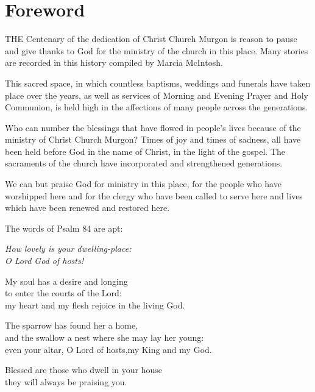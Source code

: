 \documentclass[a4paper,11pt,parskip=never,DIV=8,chapterprefix=true,titlepage=true,twoside,twocolumn,open=any]{scrbook}
\begin{document}

\chapter{Foreword}


\lettrine[lines=3]{T}{HE} Centenary of the dedication of Christ Church Murgon is reason to pause and 
give thanks to God for the ministry of the church in this place. Many stories 
are recorded in this history compiled by Marcia McIntosh.
\smallskip

\noindent
This sacred space, in which countless baptisms, weddings and funerals have taken 
place over the years, as well as services of Morning and Evening Prayer and Holy 
Communion, is held high in the affections of many people across the generations.  
\smallskip

\noindent
Who can number the blessings that have flowed in people's lives because of the 
ministry of Christ Church Murgon? Times of joy and times of sadness, all have been 
held before God in the name of Christ, in the light of the gospel. The sacraments 
of the church have incorporated and strengthened generations. 
\smallskip

\noindent
We can but praise God for ministry in this place, for the people who have worshipped 
here and for the clergy who have been called to serve here and lives which have 
been renewed and restored here.

\smallskip

\noindent The words of Psalm 84 are apt:
\smallskip

\begin{center}
\begin{minipage}[b]{.6\linewidth}%
{\itshape
{} How lovely is your dwelling-place:\\
\hphantom{MM}O Lord God of hosts!

 My soul has a desire and longing\\
\hphantom{MM}to enter the courts of the Lord:\\
\hphantom{MM}my heart and my flesh rejoice in the living God.

 The sparrow has found her a home,\\
\hphantom{MM}and the swallow a nest where she may lay her young:\\
\hphantom{MM}even your altar, O Lord of hosts,my King and my God.

 Blessed are those who dwell in your house\\
\hphantom{MM}they will always be praising you.
}
\end{minipage}%
\end{center}
\end{document}

